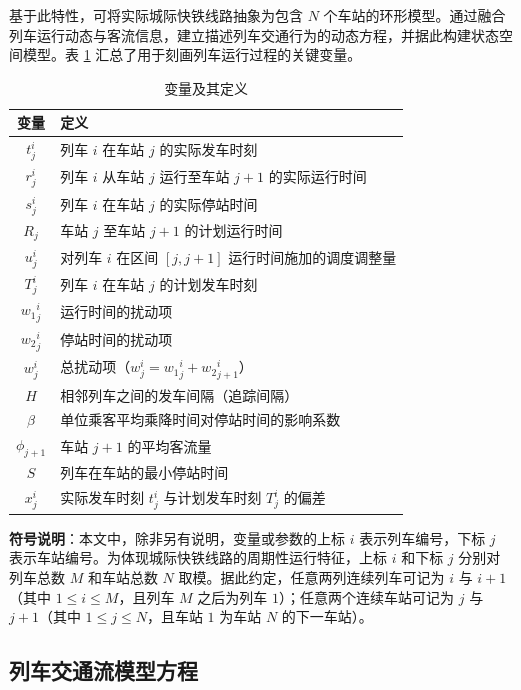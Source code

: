 基于此特性，可将实际城际快铁线路抽象为包含 $N$ 个车站的环形模型。通过融合列车运行动态与客流信息，建立描述列车交通行为的动态方程，并据此构建状态空间模型。表 \ref{table1} 汇总了用于刻画列车运行过程的关键变量。

\begin{table}
	\centering
	\caption{变量及其定义}
	\label{table1}
	\begin{tabular}{cp{9cm}}
		\hline
		变量 & 定义 \\
		\hline
		$t_{j}^{i}$ & 列车 $i$ 在车站 $j$ 的实际发车时刻 \\
		$r_{j}^{i}$ & 列车 $i$ 从车站 $j$ 运行至车站 $j+1$ 的实际运行时间 \\
		$s_{j}^{i}$ & 列车 $i$ 在车站 $j$ 的实际停站时间 \\
		$R_{j}$ & 车站 $j$ 至车站 $j+1$ 的计划运行时间 \\
		$u_{j}^{i}$ & 对列车 $i$ 在区间 $[j, j+1]$ 运行时间施加的调度调整量 \\
		$T_{j}^{i}$ & 列车 $i$ 在车站 $j$ 的计划发车时刻 \\
		${w_1}_{j}^{i}$ & 运行时间的扰动项 \\
		${w_2}_{j}^{i}$ & 停站时间的扰动项 \\
		$w_{j}^{i}$ & 总扰动项（$w_{j}^{i} = {w_1}_{j}^{i} + {w_2}_{j+1}^{i}$）\\
		$H$ & 相邻列车之间的发车间隔（追踪间隔）\\
		$\beta$ & 单位乘客平均乘降时间对停站时间的影响系数 \\
		$\phi_{j+1}$ & 车站 $j+1$ 的平均客流量 \\
		$S$ & 列车在车站的最小停站时间 \\
		$x_{j}^{i}$ & 实际发车时刻 $t_j^i$ 与计划发车时刻 $T_j^i$ 的偏差 \\
		\hline
	\end{tabular}
\end{table}

\textbf{符号说明}：本文中，除非另有说明，变量或参数的上标 $i$ 表示列车编号，下标 $j$ 表示车站编号。为体现城际快铁线路的周期性运行特征，上标 $i$ 和下标 $j$ 分别对列车总数 $M$ 和车站总数 $N$ 取模。据此约定，任意两列连续列车可记为 $i$ 与 $i+1$（其中 $1 \leq i \leq M$，且列车 $M$ 之后为列车 $1$）；任意两个连续车站可记为 $j$ 与 $j+1$（其中 $1 \leq j \leq N$，且车站 $1$ 为车站 $N$ 的下一车站）。

\subsection{列车交通流模型方程}

